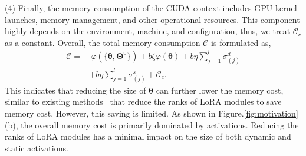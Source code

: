 \documentclass[sigconf]{acmart}
\begin{document}
(4) Finally, the memory consumption of the CUDA context includes GPU kernel launches, memory management, and other operational resources. 
This component highly depends on the environment, machine, and configuration, thus, we treat $\mathcal{C}_c$ as a constant. Overall, the total memory consumption $\mathcal{C}$ is formulated as, 
\begin{equation}\label{eq:memory_model}
\begin{aligned}
\mathcal{C} = & \ \varphi(\{\boldsymbol{\theta}, \boldsymbol{\Theta}^0\}) + b\zeta\varphi(\boldsymbol{\theta}) + b\eta{\textstyle \sum_{j=1}^{l}}\sigma_{(j)}^d  \\
& + b\eta{\textstyle \sum_{j=1}^{l}}\sigma_{(j)}^s
 + \mathcal{C}_c.
\end{aligned}
\end{equation}
This indicates that reducing the size of $\boldsymbol{\theta}$ can further lower the memory cost, similar to existing methods~\cite{cho2024heterogeneous,wangflora,bai2024federated} that reduce the ranks of LoRA modules to save memory cost. However, this saving is limited. As shown in Figure.\ref{fig:motivation}(b), the overall memory cost is primarily dominated by activations. Reducing the ranks of LoRA modules has a minimal impact on the size of both dynamic and static activations. 

\end{document}
